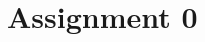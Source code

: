 \documentclass[letterpaper,10pt]{article}
\begin{document}
	
	\section*{Assignment 0}


	
\end{document}
